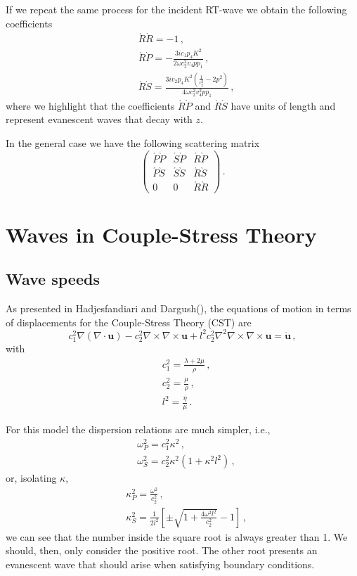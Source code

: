 \documentclass[12pt]{article}
\begin{document}
If we repeat the same process for the incident RT-wave we obtain the following coefficients
\begin{align}
&\acute{R}\grave{R} = -1\, ,\\
&\acute{R}\grave{P} = -\frac{3i c_1 p_4 K^2}{2 \omega c_2^2 v_4 p p_1}\, ,\\
&\acute{R}\grave{S} = \frac{3i v_2 p_4 K^2\left(\frac{1}{c_2^2} - 2 p^2\right)}{4 \omega c_2^2 v_4^2 p p_1}\, ,
\end{align}
where we highlight that the coefficients \(\acute{R}\grave{P}\) and \(\acute{R}\grave{S}\) have units of length and represent evanescent waves that decay with \(z\).

In the general case we have the following scattering matrix
\[\begin{pmatrix}
\acute{P}\grave{P} &\acute{S}\grave{P} &\acute{R}\grave{P}\\
\acute{P}\grave{S} &\acute{S}\grave{S} &\acute{R}\grave{S}\\
0 &0 &\acute{R}\grave{R}
\end{pmatrix}\, .\]


\section{Waves in Couple-Stress Theory}
\subsection{Wave speeds}
As presented in Hadjesfandiari and Dargush(), the equations of motion in terms of displacements for the Couple-Stress Theory (CST) are
\[c_1^2 \nabla (\nabla \cdot \mathbf{u}) - c_2^2\nabla\times \nabla \times \mathbf{u} + l^2 c_2^2 \nabla^2 \nabla \times \nabla \times \mathbf{u} = \ddot{\mathbf{u}}\, ,\]
with
\begin{align*}
&c_1^2 = \frac{\lambda + 2\mu}{\rho}\, ,\\
&c_2^2 = \frac{\mu}{\rho}\, ,\\
&l^2 = \frac{\eta}{\mu}\, .
\end{align*}

For this model the dispersion relations are much simpler, i.e.,
\begin{align*}
&\omega_P^2 = c_1^2 \kappa^2\, ,\\
&\omega_S^2 = c_2^2 \kappa^2 (1 + \kappa^2 l^2)\, ,
\end{align*}
or, isolating \(\kappa\),
\begin{align*}
&\kappa_P^2 = \frac{\omega^2}{c_2^2}\, ,\\
&\kappa_S^2 = \frac{1}{2 l^2}\left[\pm\sqrt{1 + \frac{4\omega^2 l^2}{c_2^2}} - 1\right]\, ,
\end{align*}
we can see that the number inside the square root is always greater than 1. We should, then, only consider the positive root. The other root presents an evanescent wave that should arise when satisfying boundary conditions.
\end{document}
